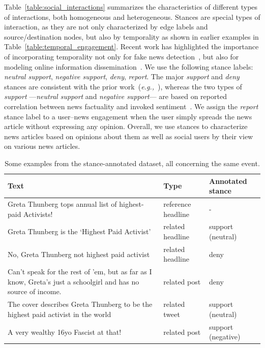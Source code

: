 \documentclass[sigconf]{acmart}
\theoremstyle{definition}
\theoremstyle{hypothesis}
\begin{document}
Table~\ref{table:social_interactions} summarizes the characteristics of different types of interactions, both homogeneous and heterogeneous. Stances are special types of interaction, as they are not only characterized by edge labels and source/destination nodes, but also by temporality as shown in earlier examples in Table~\ref{table:temporal_engagement}. Recent work has highlighted the importance of incorporating temporality not only for fake news detection~\cite{ruchansky2017csi,ma2015detect}, but also for modeling online information dissemination~\cite{he2014predicting}. We use the following stance labels: \textit{neutral support}, \textit{negative support}, \textit{deny}, \textit{report}. The major \textit{support} and \textit{deny} stances are consistent with the prior work~(\textit{e.g.,}~\cite{mohtarami2018automatic}), 
whereas the two types of \textit{support} ---\textit{neutral support} and \textit{negative support}--- are based on reported correlation between news factuality and invoked sentiment~\cite{Ajao2019}. We assign the \emph{report} stance label to a user--news engagement when the user simply spreads the news article without expressing any opinion. 
Overall, we use stances to characterize news articles based on opinions about them as well as social users by their view on various news articles.

\begin{table}[tbh]
  \centering
  \small
    \caption{Some examples from the stance-annotated dataset, all concerning the same event.}
  \begin{tabular}{lll}
  \toprule
    \bf Text & \bf Type & \bf Annotated stance \\ \midrule
  Greta Thunberg tops annual list of highest-paid Activists! & reference headline & - \\
  Greta Thunberg is the ‘Highest Paid Activist’ & related headline & support (neutral) \\
  No, Greta Thunberg not highest paid activist & related headline & deny \\
  Can't speak for the rest of 'em, but as far as I know, Greta's just a schoolgirl and has no source of income. & related post & deny \\
  The cover describes Greta Thunberg to be the highest paid activist in the world & related tweet & support (neutral) \\
  A very wealthy 16yo Fascist at that! & related post & support (negative) \\ \bottomrule
  \end{tabular}
  \label{table:stance_annotation}
\end{table}
\end{document}

